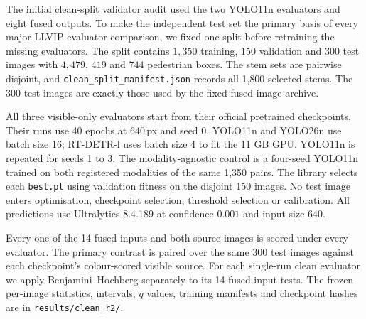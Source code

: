 \documentclass[11pt,a4paper]{article}
\begin{document}
The initial clean-split validator audit used the two YOLO11n evaluators and
eight fused outputs. To make the independent test set the primary basis of every major
LLVIP evaluator comparison, we fixed one split before retraining the missing
evaluators. The split contains $1{,}350$ training, $150$ validation and $300$ test
images with $4{,}479$, $419$ and $744$ pedestrian boxes. The stem sets are pairwise
disjoint, and \texttt{clean\_split\_manifest.json} records all 1,800 selected stems.
The 300 test images are exactly those used by the fixed fused-image archive.

All three visible-only evaluators start from their official pretrained checkpoints.
Their runs use 40 epochs at $640$\,px and seed 0. YOLO11n and YOLO26n use batch size 16;
RT-DETR-l uses batch size 4 to fit the 11 GB GPU. YOLO11n is repeated for seeds 1 to 3.
The modality-agnostic control is a four-seed YOLO11n trained on both registered
modalities of the same 1,350 pairs. The library selects each \texttt{best.pt} using
validation fitness on the disjoint 150 images. No test image enters optimisation,
checkpoint selection, threshold selection or calibration. All predictions use
Ultralytics 8.4.189 at confidence $0.001$ and input size $640$.

Every one of the 14 fused inputs and both source images is scored under every
evaluator. The primary contrast is paired over the same 300 test images against each
checkpoint's colour-scored visible source. For each single-run clean evaluator we apply
Benjamini--Hochberg separately to its 14 fused-input tests. The frozen per-image
statistics, intervals, $q$ values, training manifests and checkpoint hashes are in
\texttt{results/clean\_r2/}.
\end{document}
